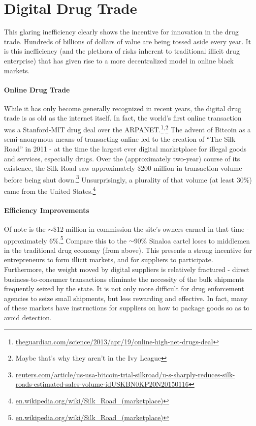 \documentclass[12pt]{article}
\begin{document}
\section{Digital Drug Trade}

This glaring inefficiency clearly shows the incentive for innovation in the drug trade. Hundreds of billions of dollars of value are being tossed aside every year. It is this inefficiency (and the plethora of risks inherent to traditional illicit drug enterprise) that has given rise to a more decentralized model in online black markets.

\paragraph{Online Drug Trade} While it has only become generally recognized in recent years, the digital drug trade is as old as the internet itself. In fact, the world's first online transaction was a Stanford-MIT drug deal over the ARPANET.\footnote{\url{theguardian.com/science/2013/apr/19/online-high-net-drugs-deal}}$^,$\footnote{Maybe that's why they aren't in the Ivy League} The advent of Bitcoin as a semi-anonymous means of transacting online led to the creation of ``The Silk Road'' in 2011 - at the time the largest ever digital marketplace for illegal goods and services, especially drugs. Over the (approximately two-year) course of its existence, the Silk Road saw approximately \$200 million in transaction volume before being shut down.\footnote{\url{reuters.com/article/us-usa-bitcoin-trial-silkroad/u-s-sharply-reduces-silk-roads-estimated-sales-volume-idUSKBN0KP20N20150116}}
Unsurprisingly, a plurality of that volume (at least 30\%) came from the United States.\footnote{\url{en.wikipedia.org/wiki/Silk_Road_(marketplace)}}

\paragraph{Efficiency Improvements} Of note is the $\sim$\$12 million in commission the site's owners earned in that time - approximately 6\%.\footnote{ \url{en.wikipedia.org/wiki/Silk_Road_(marketplace)}} Compare this to the $\sim$90\% Sinaloa cartel loses to middlemen in the traditional drug economy (from above). This presents a strong incentive for entrepreneurs to form illicit markets, and for suppliers to participate. Furthermore, the weight moved by digital suppliers is relatively fractured - direct business-to-consumer transactions eliminate the necessity of the bulk shipments frequently seized by the state. It is not only more difficult for drug enforcement agencies to seize small shipments, but less rewarding and effective. In fact, many of these markets have instructions for suppliers on how to package goods so as to avoid detection.
\\
\end{document}
